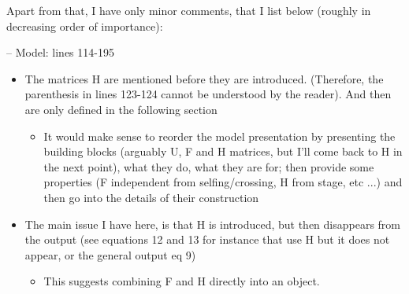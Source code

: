 \documentclass[11pt]{article}
\begin{document}
\noindent Apart from that, I have only minor comments, that I list below (roughly in decreasing order of importance):
\bigskip 

\noindent -- Model: lines 114-195
\begin{itemize}
	\item The matrices H are mentioned before they are introduced. (Therefore, the parenthesis in lines 123-124 cannot be understood by the reader). And then are only defined in the following section	
	\begin{itemize}
		\item It would make sense to reorder the model presentation by presenting the building blocks (arguably U, F and H matrices, but I'll come back to H in the next point), what they do, what they are for; then provide some properties (F independent from selfing/crossing, H from stage, etc ...) and then go into the details of their construction
	\end{itemize}
	\item The main issue I have here, is that H is introduced, but then disappears from the output (see equations 12 and 13 for instance that use H but it does not appear, or the general output eq 9)
	\begin{itemize}
		\item This suggests combining F and H directly into an object.
	\end{itemize}
\end{itemize}
\end{document}
